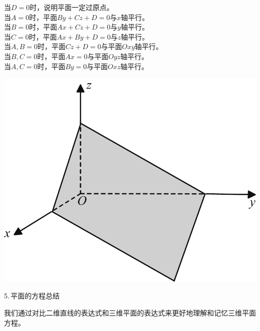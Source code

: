 \vspace*{-1em}
\noindent
\begin{minipage}{0.6\linewidth}
当$D=0$时，说明平面一定过原点。\\
当$A=0$时，平面$By+Cz+D=0$与$x$轴平行。\\
当$B=0$时，平面$Ax+Cz+D=0$与$y$轴平行。\\
当$C=0$时，平面$Ax+By+D=0$与$z$轴平行。\\
当$A,B=0$时，平面$Cz+D=0$与平面$Oxy$轴平行。\\
当$B,C=0$时，平面$Ax=0$与平面$Oyz$轴平行。\\
当$A,C=0$时，平面$By=0$与平面$Oxz$轴平行。\\
\end{minipage}
\begin{minipage}{0.4\linewidth}
	\centering
	\includegraphics[width = 0.8\linewidth]{pic/C-5/plane3}
	\vspace*{-1em}
	\label{平面的截距式方程}
\end{minipage}
5.$\,$平面的方程总结
\par 我们通过对比二维直线的表达式和三维平面的表达式来更好地理解和记忆三维平面方程。
\begin{table}[h]
	\centering
\end{table}
